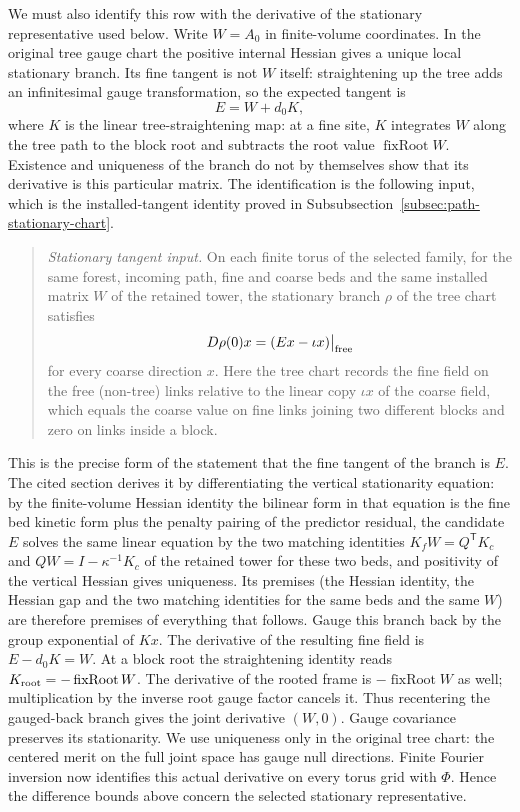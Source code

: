 We must also identify this row with the derivative of the stationary
representative used below. Write $W=A_0$ in finite-volume coordinates.
In the original tree gauge chart the positive internal Hessian gives a
unique local stationary branch. Its fine tangent is not $W$ itself:
straightening up the tree adds an infinitesimal gauge transformation,
so the expected tangent is
\[
                         E=W+d_0K,
\]
where $K$ is the linear tree-straightening map: at a fine site, $K$
integrates $W$ along the tree path to the block root and subtracts the
root value $\operatorname{fixRoot}W$. Existence and uniqueness of the
branch do not by themselves show that its derivative is this particular
matrix. The identification is the following input, which is the
installed-tangent identity proved in
Subsubsection~\ref{subsec:path-stationary-chart}.

\begin{quote}
\emph{Stationary tangent input.} On each finite torus of the selected
family, for the same forest, incoming path, fine and coarse beds and the
same installed matrix $W$ of the retained tower, the stationary branch
$\rho$ of the tree chart satisfies
\[
          D\rho(0)x=(Ex-\iota x)\big|_{\rm free}
\]
for every coarse direction $x$. Here the tree chart records the fine
field on the free (non-tree) links relative to the linear copy
$\iota x$ of the coarse field, which equals the coarse value on fine
links joining two different blocks and zero on links inside a block.
\end{quote}

\noindent
This is the precise form of the statement that the fine tangent of
the branch is $E$. The cited section derives it by differentiating the
vertical stationarity equation: by the finite-volume Hessian identity
the bilinear form in that equation is the fine bed kinetic form plus
the penalty pairing of the predictor residual, the candidate $E$ solves
the same linear equation by the two matching identities
$K_fW=Q^{\mathsf T}K_c$ and $QW=I-\kappa^{-1}K_c$ of the retained tower
for these two beds, and positivity of the vertical Hessian gives
uniqueness. Its premises (the Hessian identity, the Hessian gap and the
two matching identities for the same beds and the same $W$) are
therefore premises of everything that follows. Gauge this branch back
by the group exponential of $Kx$. The derivative of the resulting fine
field is $E-d_0K=W$. At a block root the straightening identity reads
$K_{\rm root}=-\operatorname{fixRoot}W$. The derivative of the rooted
frame is $-\operatorname{fixRoot}W$ as well; multiplication by the inverse
root gauge factor cancels it. Thus recentering the gauged-back branch
gives the joint derivative $(W,0)$. Gauge covariance preserves its
stationarity. We use uniqueness only in the original tree chart:
the centered merit on the full joint space has gauge null directions.
Finite Fourier inversion now identifies this actual derivative on every
torus grid with $\Phi$. Hence the difference bounds above concern the
selected stationary representative.

